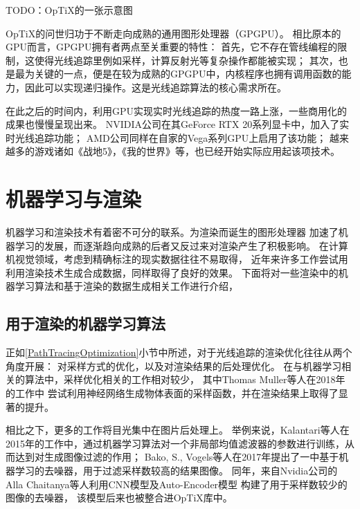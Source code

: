 TODO：OpTiX的一张示意图

OpTiX的问世归功于不断走向成熟的通用图形处理器（GPGPU）。
相比原本的GPU而言，GPGPU拥有者两点至关重要的特性：
首先，它不存在管线编程的限制，这使得光线追踪里例如采样，计算反射光等复杂操作都能被实现；
其次，也是最为关键的一点，便是在较为成熟的GPGPU中，内核程序也拥有调用函数的能力，因此可以实现递归操作。这是光线追踪算法的核心需求所在。

在此之后的时间内，利用GPU实现实时光线追踪的热度一路上涨，一些商用化的成果也慢慢呈现出来。
NVIDIA公司在其GeForce RTX 20系列显卡中，加入了实时光线追踪功能\cite{RTXOn}；
AMD公司同样在自家的Vega系列GPU上启用了该功能\cite{Vega}；
越来越多的游戏诸如《战地5》，《我的世界》等，也已经开始实际应用起该项技术。

\section{机器学习与渲染}

机器学习和渲染技术有着密不可分的联系。为渲染而诞生的图形处理器
加速了机器学习的发展，而逐渐趋向成熟的后者又反过来对渲染产生了积极影响。
在计算机视觉领域，考虑到精确标注的现实数据往往不易取得，
近年来许多工作尝试用利用渲染技术生成合成数据，同样取得了良好的效果。
下面将对一些渲染中的机器学习算法和基于渲染的数据生成相关工作进行介绍，

\subsection{用于渲染的机器学习算法}

\label{MLDenoiser}
正如\ref{PathTracingOptimization}小节中所述，对于光线追踪的渲染优化往往从两个角度开展：
对采样方式的优化，以及对渲染结果的后处理优化。
在与机器学习相关的算法中，采样优化相关的工作相对较少，
其中Thomas Muller等人在2018年的工作\cite{Mller2018NeuralIS}中
尝试利用神经网络生成物体表面的采样函数，并在渲染结果上取得了显著的提升。

相比之下，更多的工作将目光集中在图片后处理上。
举例来说，Kalantari等人在2015年的工作中\cite{kalantari2015machine}，通过机器学习算法对一个非局部均值滤波器的参数进行训练，从而达到对生成图像过滤的作用；
Bako, S., Vogels等人在2017年提出了一中基于机器学习的去噪器\cite{bako2017kernel}，用于过滤采样数较高的结果图像。
同年，\label{AIDnoiser}来自Nvidia公司的Alla Chaitanya等人利用CNN模型及Auto-Encoder模型
构建了用于采样数较少的图像的去噪器\cite{chaitanya2017interactive}，
该模型后来也被整合进OpTiX库中。

